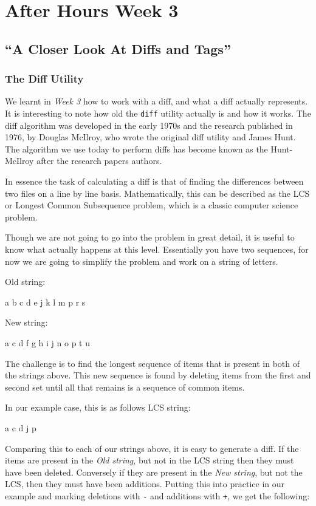 \chapter{After Hours Week 3}
\section{``A Closer Look At Diffs and Tags''}
\subsection{The Diff Utility}
We learnt in \emph{Week 3} how to work with a diff, and what a diff actually represents.
It is interesting to note how old the \texttt{diff} utility actually is and how it works.
The diff algorithm was developed in the early 1970s and the research published in 1976, by Douglas McIlroy, who wrote the original diff utility and James Hunt.
The algorithm we use today to perform diffs has become known as the Hunt-McIlroy after the research papers authors.

In essence the task of calculating a diff is that of finding the differences between two files on a line by line basis.
Mathematically, this can be described as the LCS or Longest Common Subsequence problem, which is a classic computer science problem.

Though we are not going to go into the problem in great detail, it is useful to know what actually happens at this level.
Essentially you have two sequences, for now we are going to simplify the problem and work on a string of letters.

Old string:
\begin{code}
a b c d e j k l m p r s
\end{code}

New string:
\begin{code}
a c d f g h i j n o p t u
\end{code}

The challenge is to find the longest sequence of items that is present in both of the strings above.
This new sequence is found by deleting items from the first and second set until all that remains is a sequence of common items.

In our example case, this is as follows
LCS string:
\begin{code}
a c d j p
\end{code}

Comparing this to each of our strings above, it is easy to generate a diff.
If the items are present in the \emph{Old string}, but not in the LCS string then they must have been deleted.
Conversely if they are present in the \emph{New string}, but not the LCS, then they must have been additions.
Putting this into practice in our example and marking deletions with \texttt{-} and additions with \texttt{+}, we get the following:

